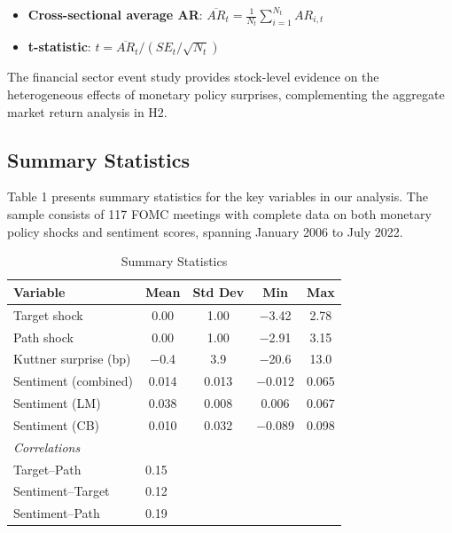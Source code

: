 \documentclass[12pt]{article}
\begin{document}
\begin{itemize}
\item \textbf{Cross-sectional average AR}: $\overline{AR}_t = \frac{1}{N_t} \sum_{i=1}^{N_t} AR_{i,t}$
\end{itemize}

\begin{itemize}
\item \textbf{t-statistic}: $t = \overline{AR}_t / (SE_t / \sqrt{N_t})$
\end{itemize}

The financial sector event study provides stock-level evidence on the heterogeneous effects of monetary policy surprises, complementing the aggregate market return analysis in H2.

\subsection{Summary Statistics}

Table 1 presents summary statistics for the key variables in our analysis. The sample consists of 117 FOMC meetings with complete data on both monetary policy shocks and sentiment scores, spanning January 2006 to July 2022.

\begin{table}[htbp]\centering\caption{Summary Statistics}\label{tab:summary}
\begin{tabular}{lcccc}\toprule
Variable & Mean & Std Dev & Min & Max \\\midrule
Target shock & 0.00 & 1.00 & $-$3.42 & 2.78 \\
Path shock & 0.00 & 1.00 & $-$2.91 & 3.15 \\
Kuttner surprise (bp) & $-$0.4 & 3.9 & $-$20.6 & 13.0 \\
Sentiment (combined) & 0.014 & 0.013 & $-$0.012 & 0.065 \\
Sentiment (LM) & 0.038 & 0.008 & 0.006 & 0.067 \\
Sentiment (CB) & 0.010 & 0.032 & $-$0.089 & 0.098 \\\midrule
\multicolumn{5}{l}{\textit{Correlations}} \\
Target--Path & \multicolumn{4}{l}{0.15} \\
Sentiment--Target & \multicolumn{4}{l}{0.12} \\
Sentiment--Path & \multicolumn{4}{l}{0.19} \\\bottomrule
\end{tabular}
\par\vspace{2pt}{\footnotesize Sample: 117 FOMC meetings, January 2006 to July 2022. Target and path shocks are standardized to unit variance.}
\end{table}
\end{document}
